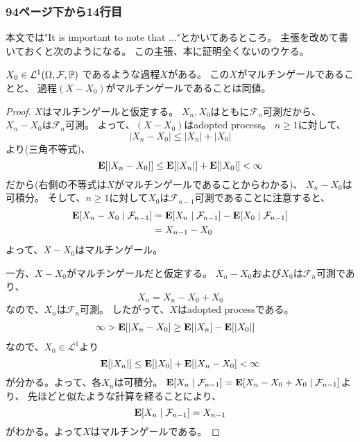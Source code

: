       \subsubsection{94ページ下から14行目}
        本文では"It is important to note that ..."とかいてあるところ。
        主張を改めて書いておくと次のようになる。
        この主張、本に証明全くないのウケる。
        \begin{prop*}
          $X_0 \in \mathcal{L}^1(\Omega, \mathcal{F}, {\mathbb{P}})$
          であるような過程$X$がある。
          この$X$がマルチンゲールであることと、
          過程$(X - X_0)$がマルチンゲールであることは同値。
        \end{prop*}
        \begin{proof}
          $X$はマルチンゲールと仮定する。
          $X_n,X_0$はともに$\mathcal{F}_n$可測だから、
          $X_n - X_0$は$\mathcal{F}_n$可測。
          よって、$(X - X_0)$はadopted process。
          $n \ge 1$に対して、
          \[
            |X_n - X_0| \leq |X_n| + |X_0|
          \]
          より(三角不等式)、
          \[
            {\mathbf{E}}[|X_n - X_0|] \leq {\mathbf{E}}[|X_n|] + {\mathbf{E}}[|X_0|] < \infty
          \]
          だから(右側の不等式は$X$がマルチンゲールであることからわかる)、
          $X_n - X_0$は可積分。
          そして、$n \ge 1$に対して$X_0$は$\mathcal{F}_{n-1}$可測であることに注意すると、
          \begin{align*}
            {\mathbf{E}}[X_n - X_0 \mid \mathcal{F}_{n-1}]
            &= {\mathbf{E}}[X_n \mid \mathcal{F}_{n-1}] - {\mathbf{E}}[X_0 \mid \mathcal{F}_{n-1}] \\
            &= X_{n-1} - X_0
          \end{align*}
          よって、$X - X_0$はマルチンゲール。

          一方、$X - X_0$がマルチンゲールだと仮定する。
          $X_n - X_0$および$X_0$は$\mathcal{F}_n$可測であり、
          \[
            X_n = X_n - X_0 + X_0
          \]
          なので、$X_n$は$\mathcal{F}_n$可測。
          したがって、$X$はadopted processである。
          \begin{align*}
            \infty &> {\mathbf{E}}[|X_n - X_0] \ge {\mathbf{E}}[|X_n] - {\mathbf{E}}[|X_0|]
          \end{align*}
          なので、$X_0 \in \mathcal{L}^1$より
          \[
            {\mathbf{E}}[|X_n|] \leq {\mathbf{E}}[|X_0] + {\mathbf{E}}[|X_n - X_0] < \infty
          \]
          が分かる。よって、各$X_n$は可積分。
          ${\mathbf{E}}[X_n \mid \mathcal{F}_{n-1}] = {\mathbf{E}}[X_n - X_0 + X_0 \mid \mathcal{F}_{n-1}]$より、
          先ほどと似たような計算を経ることにより、
          \[
            {\mathbf{E}}[X_n \mid \mathcal{F}_{n-1}] = X_{n-1}
          \]
          がわかる。よって$X$はマルチンゲールである。
        \end{proof}

